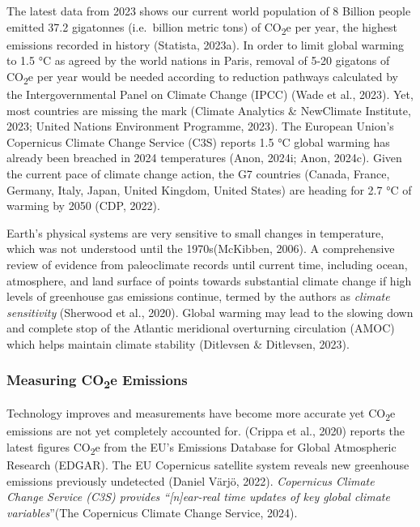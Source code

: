 \documentclass[
  letterpaper,
  DIV=11,
  numbers=noendperiod]{scrartcl}
\begin{document}
The latest data from 2023 shows our current world population of 8
Billion people emitted 37.2 gigatonnes (i.e.~billion metric tons) of
CO\textsubscript{2}e per year, the highest emissions recorded in history
(Statista, 2023a). In order to limit global warming to 1.5 °C as agreed
by the world nations in Paris, removal of 5-20 gigatons of
CO\textsubscript{2}e per year would be needed according to reduction
pathways calculated by the Intergovernmental Panel on Climate Change
(IPCC) (Wade et al., 2023). Yet, most countries are missing the mark
(Climate Analytics \& NewClimate Institute, 2023; United Nations
Environment Programme, 2023). The European Union's Copernicus Climate
Change Service (C3S) reports 1.5 °C global warming has already been
breached in 2024 temperatures (Anon, 2024i; Anon, 2024c). Given the
current pace of climate change action, the G7 countries (Canada, France,
Germany, Italy, Japan, United Kingdom, United States) are heading for
2.7 °C of warming by 2050 (CDP, 2022).

Earth's physical systems are very sensitive to small changes in
temperature, which was not understood until the 1970s(McKibben, 2006). A
comprehensive review of evidence from paleoclimate records until current
time, including ocean, atmosphere, and land surface of points towards
substantial climate change if high levels of greenhouse gas emissions
continue, termed by the authors as \emph{climate sensitivity} (Sherwood
et al., 2020). Global warming may lead to the slowing down and complete
stop of the Atlantic meridional overturning circulation (AMOC) which
helps maintain climate stability (Ditlevsen \& Ditlevsen, 2023).

\subsubsection{\texorpdfstring{Measuring CO\textsubscript{2}e
Emissions}{Measuring CO2e Emissions}}\label{measuring-co2e-emissions}

Technology improves and measurements have become more accurate yet
CO\textsubscript{2}e emissions are not yet completely accounted for.
(Crippa et al., 2020) reports the latest figures CO\textsubscript{2}e
from the EU's Emissions Database for Global Atmospheric Research
(EDGAR). The EU Copernicus satellite system reveals new greenhouse
emissions previously undetected (Daniel Värjö, 2022). \emph{Copernicus
Climate Change Service (C3S) provides ``{[}n{]}ear-real time updates of
key global climate variables}''(The Copernicus Climate Change Service,
2024).
\end{document}
